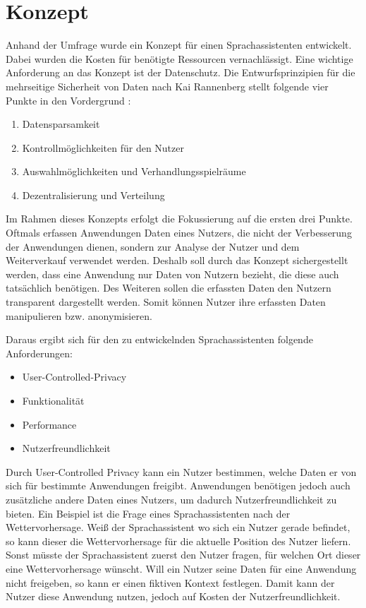 \section{Konzept}\label{sec:konzept}
Anhand der Umfrage wurde ein Konzept für einen Sprachassistenten entwickelt. Dabei wurden die Kosten für benötigte Ressourcen vernachlässigt. Eine wichtige Anforderung an das Konzept ist der Datenschutz. Die Entwurfsprinzipien für die mehrseitige Sicherheit von Daten nach Kai Rannenberg stellt folgende vier Punkte in den Vordergrund \cite{kairannenberg}:

\begin{enumerate}
	\item Datensparsamkeit
	\item Kontrollmöglichkeiten für den Nutzer 
	\item Auswahlmöglichkeiten und Verhandlungsspielräume 
	\item Dezentralisierung und Verteilung
\end{enumerate} 

Im Rahmen dieses Konzepts erfolgt die Fokussierung auf die ersten drei Punkte. Oftmals erfassen Anwendungen Daten eines Nutzers, die nicht der Verbesserung der Anwendungen dienen, sondern zur Analyse der Nutzer und dem Weiterverkauf verwendet werden. Deshalb soll durch das Konzept sichergestellt werden, dass eine Anwendung nur Daten von Nutzern bezieht, die diese auch tatsächlich benötigen. Des Weiteren sollen die erfassten Daten den Nutzern transparent dargestellt werden. Somit können Nutzer ihre erfassten Daten manipulieren bzw. anonymisieren. 

Daraus ergibt sich für den zu entwickelnden Sprachassistenten folgende Anforderungen:
\begin{itemize}
	\item User-Controlled-Privacy
	\item Funktionalität
	\item Performance
	\item Nutzerfreundlichkeit	
\end{itemize}

Durch User-Controlled Privacy kann ein Nutzer bestimmen, welche Daten er von sich für bestimmte Anwendungen freigibt. Anwendungen benötigen jedoch auch zusätzliche andere Daten eines Nutzers, um dadurch Nutzerfreundlichkeit zu bieten. Ein Beispiel ist die Frage eines Sprachassistenten nach der Wettervorhersage. Weiß der Sprachassistent wo sich ein Nutzer gerade befindet, so kann dieser die Wettervorhersage für die aktuelle Position des Nutzer liefern. Sonst müsste der Sprachassistent zuerst den Nutzer fragen, für welchen Ort dieser eine Wettervorhersage wünscht. Will ein Nutzer seine Daten für eine Anwendung nicht freigeben, so kann er einen fiktiven Kontext festlegen. Damit kann der Nutzer diese Anwendung nutzen, jedoch auf Kosten der Nutzerfreundlichkeit.

